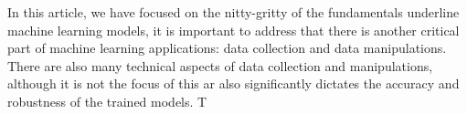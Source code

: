 In this article, we have focused on the nitty-gritty of the fundamentals underline machine learning models, it is important to address that there is another critical part of machine learning applications: data collection and data manipulations. There are also many technical aspects of data collection and manipulations, although it is not the focus of this ar also significantly dictates the accuracy and robustness of the trained models. T